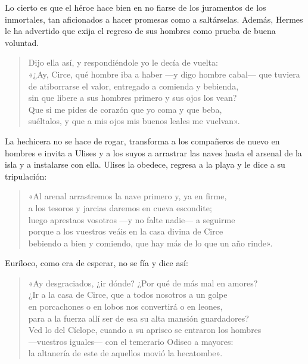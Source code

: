 \documentclass[11pt,a4paper]{article}
\begin{document}
Lo cierto es que el héroe hace bien en no fiarse de los juramentos de los inmortales, tan aficionados a hacer promesas como a saltárselas. Además, Hermes le ha advertido que exija el regreso de sus hombres como prueba de buena voluntad.

\begin{verse}
Dijo ella así, y respondiéndole yo le decía de vuelta:\\
«¿Ay, Circe, qué hombre iba a haber ---y digo hombre cabal--- que tuviera\\
de atiborrarse el valor, entregado a comienda y bebienda,\\
sin que libere a sus hombres primero y sus ojos los vean?\\
Que si me pides de corazón que yo coma y que beba,\\
suéltalos, y que a mis ojos mis buenos leales me vuelvan».
\end{verse}

La hechicera no se hace de rogar, transforma a los compañeros de nuevo en hombres e invita a Ulises y a los suyos a arrastrar las naves hasta el arsenal de la isla y a instalarse con ella. Ulises la obedece, regresa a la playa y le dice a su tripulación:

\begin{verse}
«Al arenal arrastremos la nave primero y, ya en firme,\\
a los tesoros y jarcias daremos en cueva escondite;\\
luego aprestaos vosotros ---y no falte nadie--- a seguirme\\
porque a los vuestros veáis en la casa divina de Circe\\
bebiendo a bien y comiendo, que hay más de lo que un año rinde».
\end{verse}

Euríloco, como era de esperar, no se fía y dice así:

\begin{verse}
«Ay desgraciados, ¿ir dónde? ¿Por qué de más mal en amores?\\
¿Ir a la casa de Circe, que a todos nosotros a un golpe\\
en porcachones o en lobos nos convertirá o en leones,\\
para a la fuerza allí ser de esa su alta mansión guardadores?\\
Ved lo del Cíclope, cuando a su aprisco se entraron los hombres\\
---vuestros iguales--- con el temerario Odiseo a mayores:\\
la altanería de este de aquellos movió la hecatombe».
\end{verse}
\end{document}
